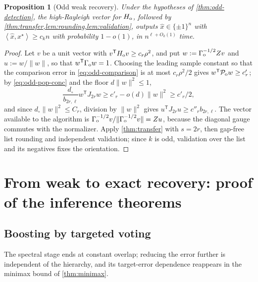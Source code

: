 \documentclass[11pt]{article}
\newtheorem{proposition}[proposition]{Proposition}
\theoremstyle{definition}
\theoremstyle{remark}
\newcommand{\1}{\mathbf 1}
\newcommand{\cP}{\mathcal P}
\newcommand{\xstar}{{x^\star}}
\newcommand{\ip}[2]{\left\langle #1,#2\right\rangle}
\numberwithin{equation}{section}
\begin{document}
\begin{proposition}[Odd weak recovery]\label{prop:odd-recovery}
Under the hypotheses of \cref{thm:odd-detection}, the high-Rayleigh vector
for $H_{\rm o}$, followed by \cref{thm:transfer,lem:rounding,lem:validation},
outputs $\widehat x\in\{\pm1\}^n$ with
$\ip{\widehat x}{\xstar}\ge c_kn$ with probability $1-o(1)$, in
$n^{\ell+O_k(1)}$ time.
\end{proposition}
\begin{proof}
Let $v$ be a unit vector with
$v^{\mathsf T}H_{\rm o}v\ge c_r\rho^2$, and put
$w:=\Gamma_{\rm o}^{-1/2}Zv$ and $u:=w/\|w\|$, so that
$w^{\mathsf T}\Gamma_{\rm o}w=1$.  Choosing the leading sample constant
so that the comparison error in \cref{eq:odd-comparison} is at most
$c_r\rho^2/2$ gives $w^{\mathsf T}\cP_{\rm o}w\ge c'_r$; by
\cref{eq:odd-pop-conc} and the floor $d\|w\|^2\le1$,
\[
 \frac{d_\circ}{b_{2r,\ell}}w^{\mathsf T}J_{2r}w
 \ge c'_r-o(d)\|w\|^2\ge c'_r/2,
\]
and since $d_\circ\|w\|^2\le C_r$, division by $\|w\|^2$ gives
$u^{\mathsf T}J_{2r}u\ge c''_rb_{2r,\ell}$.  The vector available to
the algorithm is
$\Gamma_{\rm o}^{-1/2}v/\|\Gamma_{\rm o}^{-1/2}v\|=Zu$, because the
diagonal gauge commutes with the normalizer.  Apply
\cref{thm:transfer} with $s=2r$, then gap-free list rounding and
independent validation; since $k$ is odd, validation over the list and
its negatives fixes the orientation.
\end{proof}

\section{From weak to exact recovery: proof of the inference theorems}
\label{sec:exact}

\subsection{Boosting by targeted voting}

The spectral stage ends at constant overlap; reducing the error further
is independent of the hierarchy, and its target-error dependence
reappears in the minimax bound of \cref{thm:minimax}.
\end{document}
